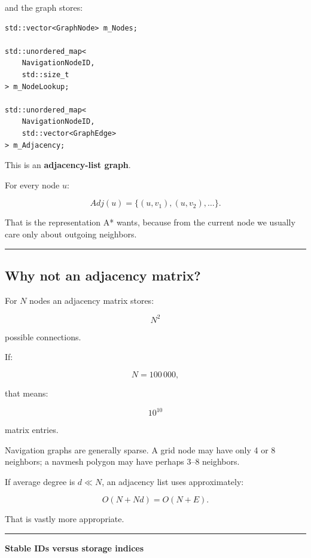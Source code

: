 and the graph stores:

\begin{verbatim}
std::vector<GraphNode> m_Nodes;

std::unordered_map<
    NavigationNodeID,
    std::size_t
> m_NodeLookup;

std::unordered_map<
    NavigationNodeID,
    std::vector<GraphEdge>
> m_Adjacency;
\end{verbatim}

This is an \textbf{adjacency-list graph}.

For every node \(u\):

\[
Adj(u)
=
\{
(u,v_1),
(u,v_2),
\dots
\}.
\]

That is the representation A* wants, because from the current node we usually care only about outgoing neighbors.

\begin{center}\rule{0.5\linewidth}{0.5pt}\end{center}

\subsection{Why not an adjacency matrix?}\label{06-engine-ii-ch030-why-not-an-adjacency-matrix}

\hypertarget{06-engine-ii-ch030-why-not-an-adjacency-matrix}{}

For \(N\) nodes an adjacency matrix stores:

\[
N^2
\]

possible connections.

If:

\[
N=100\,000,
\]

that means:

\[
10^{10}
\]

matrix entries.

Navigation graphs are generally sparse. A grid node may have only 4 or 8 neighbors; a navmesh polygon may have perhaps 3--8 neighbors.

If average degree is \(d\ll N\), an adjacency list uses approximately:

\[
O(N+Nd)
=
O(N+E).
\]

That is vastly more appropriate.

\begin{center}\rule{0.5\linewidth}{0.5pt}\end{center}

\textbf{Stable IDs versus storage indices}

